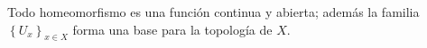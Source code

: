 \begin{Prop}
    Todo homeomorfismo es una función continua y abierta; además la familia $\left\lbrace U_x\right\rbrace_{x\in X}$ forma una base para la topología de $X$.
\end{Prop}
